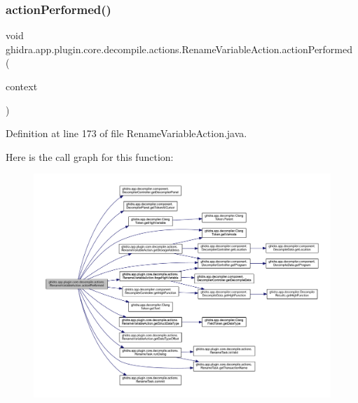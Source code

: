 \subsubsection{\texorpdfstring{actionPerformed()}{actionPerformed()}}
{\footnotesize\ttfamily void ghidra.\+app.\+plugin.\+core.\+decompile.\+actions.\+Rename\+Variable\+Action.\+action\+Performed (\begin{DoxyParamCaption}\item[{Action\+Context}]{context }\end{DoxyParamCaption})\hspace{0.3cm}{\ttfamily [inline]}}



Definition at line 173 of file Rename\+Variable\+Action.\+java.

Here is the call graph for this function\+:
\nopagebreak
\begin{figure}[H]
\begin{center}
\leavevmode
\includegraphics[width=350pt]{classghidra_1_1app_1_1plugin_1_1core_1_1decompile_1_1actions_1_1_rename_variable_action_aef0ab1f6e8e814f10bb63e343f095d37_cgraph}
\end{center}
\end{figure}
\mbox{\label{classghidra_1_1app_1_1plugin_1_1core_1_1decompile_1_1actions_1_1_rename_variable_action_a417ef24d8f7262d693795f45d87ddcf1}} 
